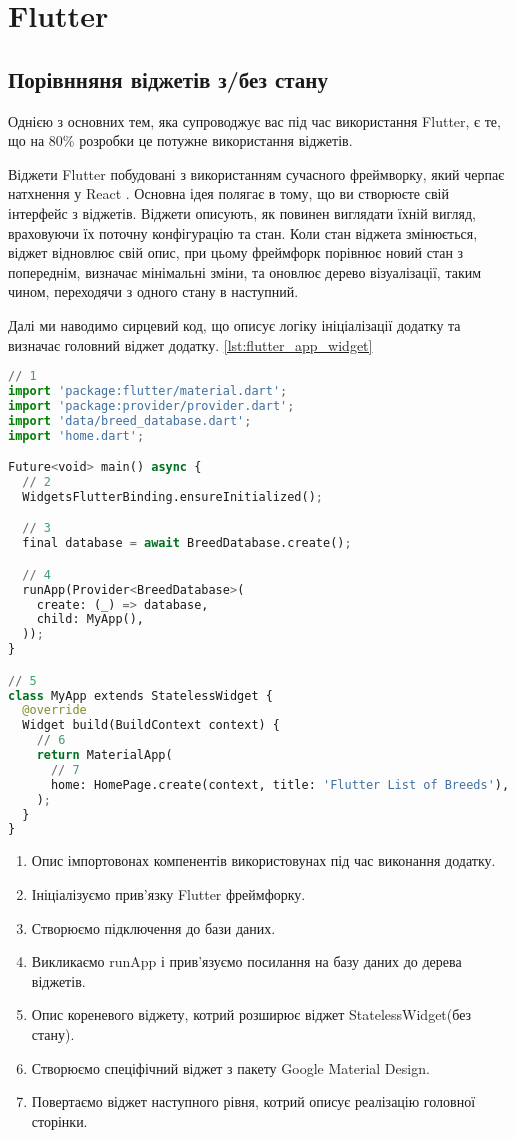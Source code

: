 \chapter{Flutter}
\label{ch3}


\section{Порівнняня віджетів з/без стану}
\label{section.3.1}
Однією з основних тем, яка супроводжує вас під час використання Flutter, є те, що на 80\% розробки це потужне використання віджетів.

Віджети Flutter побудовані з використанням сучасного фреймворку, який черпає натхнення у React \cite{flutter_widgets_intro}.
Основна ідея полягає в тому, що ви створюєте свій інтерфейс з віджетів.
Віджети описують, як повинен виглядати їхній вигляд, враховуючи їх поточну конфігурацію та стан.
Коли стан віджета змінюється, віджет відновлює свій опис, при цьому фреймфорк порівнює новий стан з попереднім,
визначає мінімальні зміни, та оновлює дерево візуалізації, таким чином, переходячи з одного стану в наступний.

Далі ми наводимо сирцевий код, що описує логіку ініціалізації додатку та визначає головний віджет додатку. \ref{lst:flutter_app_widget}

\begin{lstlisting}[style=light, language=Python,label={lst:flutter_app_widget},caption=Flutter StatelessWidget]
// 1
import 'package:flutter/material.dart';
import 'package:provider/provider.dart';
import 'data/breed_database.dart';
import 'home.dart';

Future<void> main() async {
  // 2
  WidgetsFlutterBinding.ensureInitialized();

  // 3
  final database = await BreedDatabase.create();

  // 4
  runApp(Provider<BreedDatabase>(
    create: (_) => database,
    child: MyApp(),
  ));
}

// 5
class MyApp extends StatelessWidget {
  @override
  Widget build(BuildContext context) {
    // 6
    return MaterialApp(
      // 7
      home: HomePage.create(context, title: 'Flutter List of Breeds'),
    );
  }
}
\end{lstlisting}

\begin{enumerate}
    \item Опис імпортовонах компенентів використовунах під час виконання додатку.
    \item Ініціалізуємо прив'язку Flutter фреймфорку.
    \item Створюємо підключення до бази даних.
    \item Викликаємо runApp і прив'язуємо посилання на базу даних до дерева віджетів.
    \item Опис кореневого віджету, котрий розширює віджет StatelessWidget(без стану).
    \item Створюємо спеціфічний віджет з пакету Google Material Design.
    \item Повертаємо віджет наступного рівня, котрий описує реалізацію головної сторінки.
\end{enumerate}

